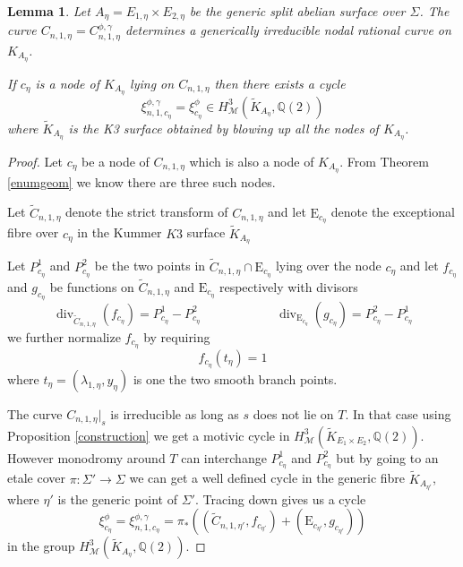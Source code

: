 \documentclass[11pt,a4paper]{article}
\newtheorem{lem}[defn]{Lemma}
\newcommand {\Q}{{\mathds Q}}
\newcommand {\M}{{\mathcal M}}
\newcommand {\RE}{{{\mathrm E}}}
\newcommand {\TK}{{\tilde{K}}}
\newcommand {\lb}{{\lambda}}
\newcommand {\TKE}{{{\tilde K}_{E_1\times E_2}}}
\newcommand{\TC}{\tilde{C}}
\def\div{\operatorname{div}}
\begin{document}
\begin{lem} \label{lem-higher-chow-cycles-on-KmK3}
Let $A_{\eta}=E_{1,\eta}\times E_{2,\eta}$ be the generic split abelian surface over $\Sigma$. The curve $C_{n,1,\eta}= C^{\phi,\gamma}_{n,1,\eta}$ determines a generically irreducible nodal rational  curve on $K_{A_{\eta}}$. 

If $c_{\eta}$ is a node of $K_{A_{\eta}}$ lying on $C_{n,1,\eta}$  then there exists a cycle 
%
	$$\xi^{\phi,\gamma}_{n,1,c_{\eta}}=\xi^{\phi}_{c_{\eta}} \in H^3_{\M}(\TK_{A_{\eta}},\Q(2))$$   
	where $\TK_{A_{\eta}}$ is the K3 surface  obtained by blowing up all the nodes of $K_{A_{\eta}}$. 
	
\end{lem}

\begin{proof} 
	
	
Let $c_{\eta}$ be a node of $C_{n,1,\eta}$ which is also a node of $K_{A_{\eta}}$. From  Theorem \ref{enumgeom} we know there are three such nodes. 

Let $\TC_{n,1,\eta}$ denote the strict transform of $C_{n,1,\eta}$ and let $\RE_{c_{\eta}}$ denote the exceptional fibre over $c_{\eta}$ in the Kummer $K3$ surface $\TK_{A_{\eta}}$ 

Let $P^1_{c_{\eta}}$ and $P^2_{c_{\eta}}$ be the two points in $\TC_{n,1,\eta} \cap \RE_{c_{\eta}}$ lying over the node $c_{\eta}$ and let  $f_{c_{\eta}}$ and $g_{c_{\eta}}$  be functions on $\TC_{n,1,\eta}$ and $\RE_{c_{\eta}}$ respectively with divisors 
%
$$\div_{\TC_{n,1,\eta}}(f_{c_{\eta}})=P^1_{c_{\eta}}-P^2_{c_{\eta}} \hspace{1in} \div_{\RE_{c_{\eta}}}(g_{c_{\eta}})=P^2_{c_{\eta}} - P^1_{c_{\eta}}$$ 
%
we further normalize $f_{c_{\eta}}$ by requiring 
%
$$f_{c_{\eta}}(t_{\eta})=1$$
%
where $t_{\eta}=(\lb_{1,\eta},y_{\eta})$ is one the two smooth branch points. 

The curve $C_{n,1,\eta}|_s$ is irreducible as long as $s$ does not lie on $T$. In that case using Proposition \ref{construction} we get a motivic cycle in $H^3_{\M}(\TKE,\Q(2))$. However monodromy around $T$ can interchange $P^1_{c_{\eta}}$ and $P^2_{c_{\eta}}$ but by going to an etale cover  $\pi:\Sigma' \rightarrow \Sigma$ we can get a well defined cycle in the generic fibre $\TK_{A_{\eta'}}$, where $\eta'$ is the generic point of $\Sigma'$.  Tracing down gives us a cycle 
%
$$\xi^{\phi}_{c_{\eta}}=\xi^{\phi,\gamma}_{n,1,c_{\eta}}=\pi_*((\TC_{n,1,\eta'},f_{c_{\eta'}})+(\RE_{c_{\eta'}},g_{c_{\eta'}}))$$
% 
 in the group $H^3_{\M}(\TK_{A_{\eta}},\Q(2))$. 
 
 \end{proof}
 
\end{document}
